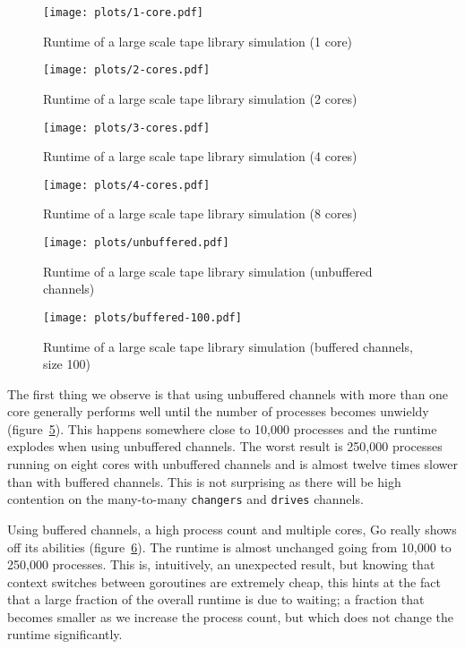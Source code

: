 \begin{figure}
	\centering
	\texttt{[image: plots/1-core.pdf]}
	\caption{Runtime of a large scale tape library simulation (1 core)}
	\label{fig:runtime1}
\end{figure}

\begin{figure}
	\centering
	\texttt{[image: plots/2-cores.pdf]}
	\caption{Runtime of a large scale tape library simulation (2 cores)}
	\label{fig:runtime2}
\end{figure}

\begin{figure}
	\centering
	\texttt{[image: plots/3-cores.pdf]}
	\caption{Runtime of a large scale tape library simulation (4 cores)}
	\label{fig:runtime4}
\end{figure}

\begin{figure}
	\centering
	\texttt{[image: plots/4-cores.pdf]}
	\caption{Runtime of a large scale tape library simulation (8 cores)}
	\label{fig:runtime8}
\end{figure}

\begin{figure}
	\centering
	\texttt{[image: plots/unbuffered.pdf]}
	\caption{Runtime of a large scale tape library simulation (unbuffered channels)}
	\label{fig:runtime-unbuffered}
\end{figure}

\begin{figure}
	\centering
	\texttt{[image: plots/buffered-100.pdf]}
	\caption{Runtime of a large scale tape library simulation (buffered channels, size 100)}
	\label{fig:runtime-buffered}
\end{figure}



The first thing we observe is that using unbuffered channels with more than one
core generally performs well until the number of processes becomes unwieldy
(figure~\ref{fig:runtime-unbuffered}). This happens somewhere close to 10,000
 processes and the runtime explodes when using unbuffered channels.
The worst result is 250,000 processes running on eight cores with unbuffered
channels and is almost twelve times slower than with buffered channels. This is
not surprising as there will be high contention on the many-to-many
\verb|changers| and \verb|drives| channels.

Using buffered channels, a high process count and multiple cores, Go really
shows off its abilities (figure~\ref{fig:runtime-buffered}). The runtime is almost
unchanged going from 10,000 to 250,000 processes. This is, intuitively, an
unexpected result, but knowing that context switches between goroutines are
extremely cheap, this hints at the fact that a large fraction of the overall
runtime is due to waiting; a fraction that becomes smaller as we increase the
process count, but which does not change the runtime significantly.

